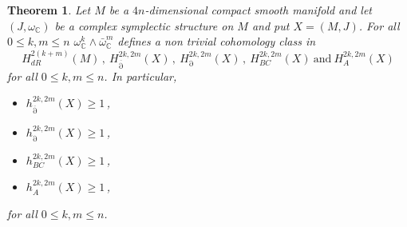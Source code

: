 \documentclass[a4paper]{amsart}
\newtheorem{theorem}{Theorem}[section]
\theoremstyle{definition}
\theoremstyle{remark}
\newcommand{\delbar}{\operatorname{\overline{\partial}}}
\newcommand{\del}{\operatorname{\partial}}
\numberwithin{equation}{section}
\begin{document}
\begin{theorem}\label{th:cohomologies}
Let $M$ be a $4n$-dimensional compact smooth manifold and let $(J,\omega_\mathbb{C})$ be a complex symplectic structure on $M$ and put $X=(M,J)$. For all $0\leq k,m\leq n$ $\omega_\mathbb{C}^k\wedge\bar \omega_\mathbb{C}^m$ defines a non trivial cohomology class in 
\[
H^{2(k+m)}_{dR}(M)\,, \ H^{2k,2m}_{\delbar}(X)\,, \ H^{2k,2m}_{\del}(X)\,, \ H^{2k,2m}_{BC}(X) \ \mathrm{and} \ H^{2k,2m}_{A}(X) 
\]
for all $0\leq k,m\leq n$. In particular,
\begin{itemize}
\item $h^{2k,2m}_{\delbar}(X)\geq 1$\,,
\item $h^{2k,2m}_{\del}(X)\geq 1$\,,
\item $h^{2k,2m}_{BC}(X)\geq 1$\,,
\item $h^{2k,2m}_{A}(X)\geq 1$\,,
\end{itemize}
for all $0\leq k,m\leq n$.
\end{theorem}
\end{document}
